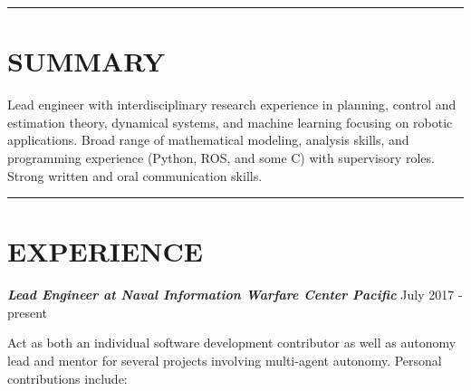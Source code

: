 \documentclass{res}
\begin{document}

 
\begin{resume}

%
%

 \vspace*{-2ex}
\hspace{-8.5ex}\rule{16.5cm}{0.4pt}
 \vspace*{-3ex}
\section{SUMMARY}
\vspace{1ex}
Lead engineer with interdisciplinary research experience in planning, control and estimation theory, dynamical systems, and machine learning focusing on robotic applications.  Broad range of mathematical modeling, analysis skills, and programming experience (Python, ROS, and some C) with supervisory roles. Strong written and oral communication skills.

 \vspace*{-4ex}
\hspace{-8.5ex}\rule{16.5cm}{0.4pt}
 \vspace*{-3ex}
\section{EXPERIENCE}
{\sl \bf Lead Engineer at Naval Information Warfare Center Pacific} \hfill July 2017 - present

\vspace*{-3ex}
 Act as both an individual software development contributor as well as autonomy lead and mentor for several projects involving multi-agent autonomy.  Personal contributions include:


\end{resume}
\end{document}
